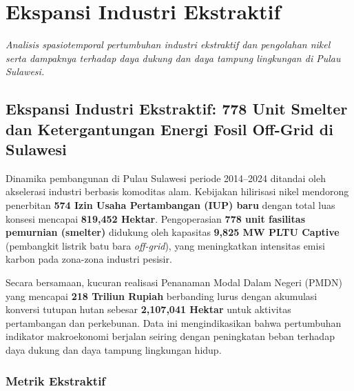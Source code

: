 \documentclass[
]{article}
\author{}
\date{}
\begin{document}
\section{Ekspansi Industri
Ekstraktif}\label{ekspansi-industri-ekstraktif}

\emph{Analisis spasiotemporal pertumbuhan industri ekstraktif dan
pengolahan nikel serta dampaknya terhadap daya dukung dan daya tampung
lingkungan di Pulau Sulawesi.}

\subsection{Ekspansi Industri Ekstraktif: 778 Unit Smelter dan
Ketergantungan Energi Fosil Off-Grid di
Sulawesi}\label{ekspansi-industri-ekstraktif-778-unit-smelter-dan-ketergantungan-energi-fosil-off-grid-di-sulawesi}

Dinamika pembangunan di Pulau Sulawesi periode 2014--2024 ditandai oleh
akselerasi industri berbasis komoditas alam. Kebijakan hilirisasi nikel
mendorong penerbitan \textbf{574 Izin Usaha Pertambangan (IUP) baru}
dengan total luas konsesi mencapai \textbf{819,452 Hektar}.
Pengoperasian \textbf{778 unit fasilitas pemurnian (smelter)} didukung
oleh kapasitas \textbf{9,825 MW PLTU Captive} (pembangkit listrik batu
bara \emph{off-grid}), yang meningkatkan intensitas emisi karbon pada
zona-zona industri pesisir.

Secara bersamaan, kucuran realisasi Penanaman Modal Dalam Negeri (PMDN)
yang mencapai \textbf{218 Triliun Rupiah} berbanding lurus dengan
akumulasi konversi tutupan hutan sebesar \textbf{2,107,041 Hektar} untuk
aktivitas pertambangan dan perkebunan. Data ini mengindikasikan bahwa
pertumbuhan indikator makroekonomi berjalan seiring dengan peningkatan
beban terhadap daya dukung dan daya tampung lingkungan hidup.

\subsubsection{Metrik Ekstraktif}\label{metrik-ekstraktif}
\end{document}
